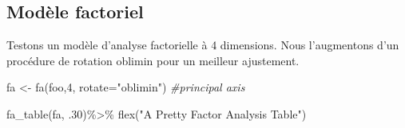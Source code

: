\documentclass[
]{book}
\newenvironment{Shaded}{\begin{snugshade}}{\end{snugshade}}
\newcommand{\AttributeTok}[1]{\textcolor[rgb]{0.77,0.63,0.00}{#1}}
\newcommand{\CommentTok}[1]{\textcolor[rgb]{0.56,0.35,0.01}{\textit{#1}}}
\newcommand{\DecValTok}[1]{\textcolor[rgb]{0.00,0.00,0.81}{#1}}
\newcommand{\FunctionTok}[1]{\textcolor[rgb]{0.00,0.00,0.00}{#1}}
\newcommand{\NormalTok}[1]{#1}
\newcommand{\OtherTok}[1]{\textcolor[rgb]{0.56,0.35,0.01}{#1}}
\newcommand{\SpecialCharTok}[1]{\textcolor[rgb]{0.00,0.00,0.00}{#1}}
\newcommand{\StringTok}[1]{\textcolor[rgb]{0.31,0.60,0.02}{#1}}
\begin{document}
\hypertarget{moduxe8le-factoriel}{%
\subsection{Modèle factoriel}\label{moduxe8le-factoriel}}

Testons un modèle d'analyse factorielle à 4 dimensions. Nous l'augmentons d'un procédure de rotation oblimin pour un meilleur ajustement.

\begin{Shaded}
\begin{Highlighting}[]
\NormalTok{fa }\OtherTok{\textless{}{-}} \FunctionTok{fa}\NormalTok{(foo,}\DecValTok{4}\NormalTok{, }\AttributeTok{rotate=}\StringTok{"oblimin"}\NormalTok{)  }\CommentTok{\#principal axis }

\FunctionTok{fa\_table}\NormalTok{(fa, .}\DecValTok{30}\NormalTok{)}\SpecialCharTok{\%\textgreater{}\%}
  \FunctionTok{flex}\NormalTok{(}\StringTok{"A Pretty Factor Analysis Table"}\NormalTok{)}
\end{Highlighting}
\end{Shaded}

\providecommand{\docline}[3]{\noalign{\global\setlength{\arrayrulewidth}{#1}}\arrayrulecolor[HTML]{#2}\cline{#3}}

\setlength{\tabcolsep}{2pt}

\renewcommand*{\arraystretch}{1.5}
\end{document}

